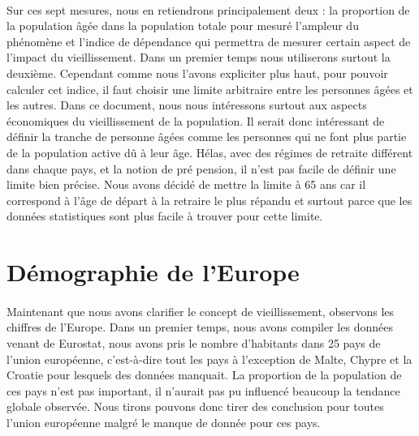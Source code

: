 \paragraph{} Sur ces sept mesures, nous en retiendrons principalement deux : la proportion de la population âgée dans la population totale pour mesuré l’ampleur du phénomène et l’indice de dépendance qui permettra de mesurer certain aspect de l’impact du vieillissement. Dans un premier temps nous utiliserons surtout la deuxième. Cependant comme nous l’avons expliciter plus haut, pour pouvoir calculer cet indice, il faut choisir une limite arbitraire entre les personnes âgées et les autres. Dans ce document, nous nous intéressons surtout aux aspects économiques du vieillissement de la population. Il serait donc intéressant de définir la tranche de personne âgées comme les personnes qui ne font plus partie de la population active dû à leur âge. Hélas, avec des régimes de retraite différent dans chaque pays\citep{age_retraite}, et la notion de pré pension, il n’est pas facile de définir une limite bien précise. Nous avons décidé de mettre la limite à 65 ans car il correspond à l’âge de départ à la retraire le plus répandu et surtout parce que les données statistiques sont plus facile à trouver pour cette limite. 

\section{Démographie de l'Europe}
\paragraph{}Maintenant que nous avons clarifier le concept de vieillissement, observons les chiffres de l’Europe. Dans un premier temps, nous avons compiler les données venant de Eurostat\citep{eurostat_pop}, nous avons pris le nombre d’habitants dans 25 pays de l’union européenne, c’est-à-dire tout les pays à l’exception de Malte, Chypre et la Croatie pour lesquels des données manquait. La proportion de la population de ces pays n’est pas important, il n’aurait pas pu influencé beaucoup la tendance globale observée. Nous tirons pouvons donc tirer des conclusion pour toutes l’union européenne malgré le manque de donnée pour ces pays.

